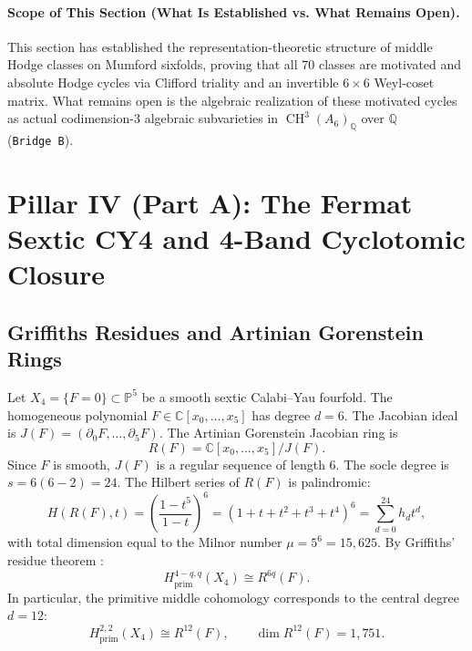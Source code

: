 \documentclass[11pt,a4paper]{article}
\theoremstyle{definition}
\theoremstyle{remark}
\DeclareMathOperator{\CH}{CH}
\begin{document}
\paragraph{Scope of This Section (What Is Established vs. What Remains Open).}
This section has established the representation-theoretic structure of middle Hodge classes on Mumford sixfolds, proving that all 70 classes are motivated and absolute Hodge cycles via Clifford triality and an invertible $6 \times 6$ Weyl-coset matrix. What remains open is the algebraic realization of these motivated cycles as actual codimension-3 algebraic subvarieties in $\CH^3(A_6)_{\mathbb{Q}}$ over $\mathbb{Q}$ (\texttt{Bridge~B}).

\section{Pillar IV (Part A): The Fermat Sextic CY4 and 4-Band Cyclotomic Closure}
\label{sec:pillar_4a}

\subsection{Griffiths Residues and Artinian Gorenstein Rings}
Let $X_4 = \{F = 0\} \subset \mathbb{P}^5$ be a smooth sextic Calabi--Yau fourfold. The homogeneous polynomial $F \in \mathbb{C}[x_0,\dots,x_5]$ has degree $d = 6$. The Jacobian ideal is $J(F) = (\partial_0 F, \dots, \partial_5 F)$. The Artinian Gorenstein Jacobian ring is
\begin{equation}
R(F) = \mathbb{C}[x_0,\dots,x_5] / J(F).
\end{equation}
Since $F$ is smooth, $J(F)$ is a regular sequence of length 6. The socle degree is $s = 6(6 - 2) = 24$. The Hilbert series of $R(F)$ is palindromic:
\begin{equation}
H(R(F), t) = \left( \frac{1 - t^5}{1 - t} \right)^6 = (1 + t + t^2 + t^3 + t^4)^6 = \sum_{d=0}^{24} h_d t^d,
\end{equation}
with total dimension equal to the Milnor number $\mu = 5^6 = 15,625$. By Griffiths' residue theorem \cite{CarlsonGriffiths1980}:
\begin{equation}
H^{4-q,q}_{\mathrm{prim}}(X_4) \cong R^{6q}(F).
\end{equation}
In particular, the primitive middle cohomology corresponds to the central degree $d = 12$:
\begin{equation}
H^{2,2}_{\mathrm{prim}}(X_4) \cong R^{12}(F), \qquad \dim R^{12}(F) = 1,751.
\end{equation}
\end{document}
